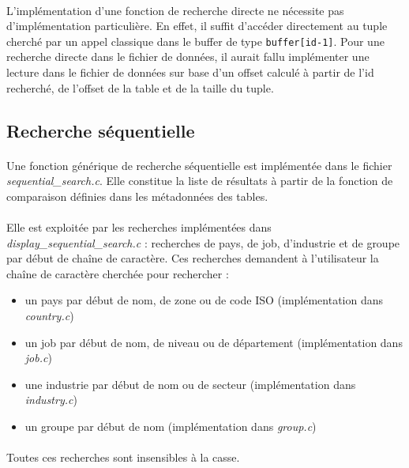 \documentclass{article}
\begin{document}
    \paragraph{}
    L'implémentation d'une fonction de recherche directe ne nécessite pas d'implémentation particulière. En effet, il suffit d'accéder directement au tuple cherché par un appel classique dans le buffer de type \texttt{buffer[id-1]}. Pour une recherche directe dans le fichier de données, il aurait fallu implémenter une lecture dans le fichier de données sur base d'un offset calculé à partir de l'id recherché, de l'offset de la table et de la taille du tuple.


    \subsection{Recherche séquentielle}
    \paragraph{}
    Une fonction générique de recherche séquentielle est implémentée dans le fichier \emph{sequential\_search.c}. Elle constitue la liste de résultats à partir de la fonction de comparaison définies dans les métadonnées des tables.

    \paragraph{}
    Elle est exploitée par les recherches implémentées dans \emph{display\_sequential\_search.c} : recherches de pays, de job, d'industrie et de groupe par début de chaîne de caractère. Ces recherches demandent à l'utilisateur la chaîne de caractère cherchée pour rechercher :
    \begin{itemize}[label=$\bullet$]
        \item un pays par début de nom, de zone ou de code ISO (implémentation dans \emph{country.c})
        \item un job par début de nom, de niveau ou de département (implémentation dans \emph{job.c})
        \item une industrie par début de nom ou de secteur (implémentation dans \emph{industry.c})
        \item un groupe par début de nom (implémentation dans \emph{group.c})
    \end{itemize}

    \paragraph{}
    Toutes ces recherches sont insensibles à la casse.
\end{document}
